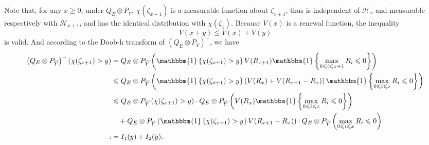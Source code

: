 \documentclass[]{article}
\makeatletter
\numberwithin{equation}{section}
\renewenvironment{proof}[1][\proofname]{%
	\par\pushQED{\qed}\normalfont%
	\topsep6\p@\@plus6\p@\relax
	\trivlist\item[\hskip\labelsep\bfseries#1\@addpunct{.}]%
	\ignorespaces
}{%
	\popQED\endtrivlist\@endpefalse
}
\theoremstyle{thmstyleone}%
\theoremstyle{thmstyletwo}%
\theoremstyle{thmstylethree}%
\theoremstyle{thmstylefour}%
\theoremstyle{thmstylefive}%
\theoremstyle{thmstylesix}%
\newcommand{\ind}[1]{\mathbbm{1}\left\{ #1\right\}}
\makeatother
\begin{document}
\begin{proof}[Proof of \Cref{lemma1 for intermediately}]
		Note that, for any $x\geqslant0$, under $ Q_E\otimes P_{\overline{Y}} $, $\chi(\zeta_{x+1})$ is a measurable function about $\zeta_{x+1}$, thus is independent of $\mathcal{H}_x$ and measurable respectively with $\mathcal{H}_{x+1}$, and has the identical distribution with $\chi(\zeta_{1})$.
		Because $V(x)$ is a renewal function, the inequality
		\begin{equation*}
			V(x+y) \leqslant V(x)+V(y)
		\end{equation*}
		is valid.
		And according to the Doob-h transform of $\left(Q_E\otimes P_{\overline{Y}}\right)^-$, we have
		\begin{align}
			\left(Q_E\otimes P_{\overline{Y}}\right)^- (\chi(\zeta_{x+1}) > y)
			&=
			Q_E\otimes P_{\overline{Y}} \left(\ind{\chi(\zeta_{x+1}) > y} V(R_{x+1}) \ind{ \max\limits_{0\leqslant i\leqslant x+1} R_i \leqslant 0} \right)
			\nonumber\\
			&\leqslant
			Q_E\otimes P_{\overline{Y}} \left(\ind{\chi(\zeta_{x+1}) > y} \left(V(R_{x})+V(R_{x+1}-R_x)\right) \ind{ \max\limits_{0\leqslant i\leqslant x} R_i \leqslant 0} \right)
			\nonumber\\
			&\leqslant
			Q_E\otimes P_{\overline{Y}} \left(\chi(\zeta_{x+1})>y\right)
			\cdot Q_E\otimes P_{\overline{Y}} \left( V(R_x)  \ind{ \max\limits_{0\leqslant i\leqslant x} R_i \leqslant 0} \right)
			\nonumber\\
			&~~~+
			Q_E \otimes P_{\overline{Y}} \left(
			\ind{\chi(\zeta_{x+1}) > y} V(R_{x+1}-R_x) \right)
			\cdot  Q_E\otimes P_{\overline{Y}}
			\left( \max\limits_{0\leqslant i\leqslant x} R_i \leqslant 0
			\right)
			\nonumber\\
			:&= I_1(y) + I_2(y)\label{100}.
		\end{align}
		

\end{proof}
\end{document}
